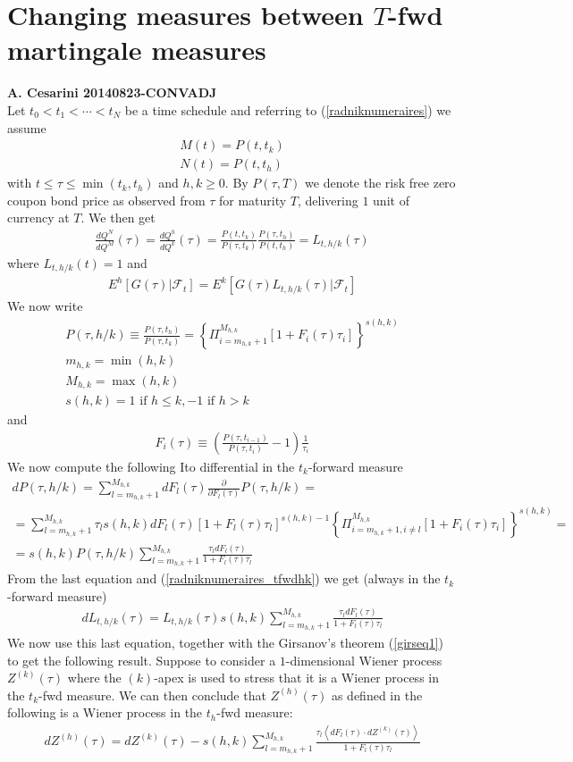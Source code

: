 \documentclass[12pt, a4paper]{article}
\newcommand\be{\begin{eqnarray}}
\newcommand\ee{\end{eqnarray}}
\newcommand{\FF} {\mathcal{F} }
\begin{document}
\section{Changing measures between $T$-fwd martingale measures \label{t_fwd_measure_changes}}
{\bf{A. Cesarini 20140823-CONVADJ}} \\
Let $t_0<t_1<\cdots < t_{N}$ be a time schedule and referring to (\ref{radniknumeraires}) we assume
\be 
M(t) = P(t, t_k) \\
N(t) = P(t, t_h)
\ee
with $t\le \tau \le \min(t_k, t_h)$ and $h,k\ge 0$. By $P(\tau, T)$ we denote the risk free zero coupon bond price as observed from $\tau$ for maturity $T$, delivering $1$ unit of currency at $T$. We then get
\be 
\frac{dQ^N}{dQ^M}(\tau) =  \frac{dQ^h}{dQ^k}(\tau) =  \frac{P(t, t_k)}{P(\tau, t_k)} \frac{P(\tau, t_h)}{P(t, t_h)}=L_{t, h/k}(\tau)
\label{radniknumeraires_tfwdhk}
\ee
where $L_{t, h/k}(t)=1$ and 
\be 
E^h\left[G(\tau)| \FF_t \right] = E^k\left[G(\tau) L_{t, h/k}(\tau) | \FF_t \right]
\ee
We now write
\be 
P(\tau, h/k) \equiv \frac{P(\tau, t_h)}{P(\tau, t_k)}= \left\{\Pi_{i=m_{h,k}+1}^{M_{h,k}}\left[ 1 + F_i(\tau)\tau_i \right]\right\}^{s(h,k)} \label{phk}\\
m_{h,k} = \min(h, k)\\
M_{h,k} = \max(h, k) \\
s(h,k) = 1 \mbox{ if $h\le k$}, -1 \mbox{ if $h> k$}
\ee
and 
\be
F_i(\tau)\equiv \left(\frac{P(\tau, t_{i-1})}{P(\tau, t_i)}-1\right)\frac{1}{\tau_i}
\ee
We now compute the following Ito differential in the $t_k$-forward measure
\be 
d P(\tau, h/k) = \sum_{l=m_{h,k}+1}^{M_{h,k}} d F_l(\tau) \frac{\partial}{\partial F_l(\tau)}  P(\tau, h/k) =\\
=\sum_{l=m_{h,k}+1}^{M_{h,k}}\tau_l  s(h,k)  d F_l(\tau)\left[ 1 + F_l(\tau)\tau_l \right]^{s(h,k)-1}  \left\{\Pi_{i=m_{h,k}+1, i\neq l}^{M_{h,k}}\left[ 1 + F_i(\tau)\tau_i \right]\right\}^{s(h,k)}= \\
= s(h,k) P(\tau, h/k) \sum_{l=m_{h,k}+1}^{M_{h,k}} \frac{\tau_l  d F_l(\tau)}{1 + F_l(\tau)\tau_l } 
\label{dphk}
\ee
From the last equation and (\ref{radniknumeraires_tfwdhk}) we get (always in the $t_k$-forward measure)
\be 
d L_{t, h/k}(\tau) = L_{t, h/k}(\tau)  s(h,k) \sum_{l=m_{h,k}+1}^{M_{h,k}} \frac{\tau_l  d F_l(\tau)}{1 + F_l(\tau)\tau_l } 
\ee
We now use this last equation, together with the Girsanov's theorem (\ref{girseq1}) to get the following result.
Suppose to consider a $1$-dimensional Wiener process $Z^{(k)}(\tau)$ where the $(k)$-apex is used to stress that it is a Wiener process in the $t_k$-fwd measure. We can then conclude that $Z^{(h)}(\tau)$ as defined in the following is a Wiener process in the $t_h$-fwd measure:
\be 
dZ^{(h)}(\tau) = dZ^{(k)}(\tau)- s(h,k) \sum_{l=m_{h,k}+1}^{M_{h,k}} \frac{\tau_l  \left<d F_l(\tau)\cdot dZ^{(k)}(\tau)\right>}{1 + F_l(\tau)\tau_l } 
\label{tfwdmeasurechangedet}
\ee
\end{document}
